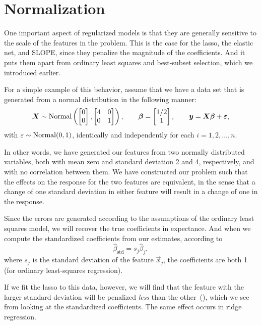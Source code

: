 \section{Normalization}\label{sec:normalization}

One important aspect of regularized models is that they are generally sensitive to the scale of the features in the problem. This is the case for the lasso, the elastic net, and SLOPE, since they penalize the magnitude of the coefficients. And it puts them apart from ordinary least squares and best-subset selection, which we introduced earlier.

For a simple example of this behavior, assume that we have a data set that is generated from a normal distribution in the following manner:
\[
  \boldsymbol{X} \sim \operatorname{Normal}\left(\begin{bmatrix}0 \\ 0\end{bmatrix}, \begin{bmatrix} 4 & 0 \\ 0 & 1\end{bmatrix}\right), \qquad \boldsymbol{\beta} = \begin{bmatrix} 1/2 \\ 1 \end{bmatrix}, \qquad \boldsymbol{y} = \boldsymbol{X}\boldsymbol{\beta} + \boldsymbol{\varepsilon},
\]
with \(\varepsilon \sim \operatorname{Normal}(0,1)\), identically and independently for each \(i = 1,2,\dots,n\).

In other words, we have generated our features from two normally distributed variables, both with mean zero and standard deviation 2 and 4, respectively, and with no correlation between them. We have constructed our problem such that the effects on the response for the two features are equivalent, in the sense that a change of one standard deviation in either feature will result in a change of one in the response.

Since the errors are generated according to the assumptions of the ordinary least squares model, we will recover the true coefficients in expectance. And when we compute the standardized coefficients from our estimates, according to
\[
  \hat{\beta}_\text{std} = s_j\hat{\beta}_j,
\]
where \(s_j\) is the standard deviation of the feature \(\vec{x}_j\), the coefficients are both 1 (for ordinary least-squares regression).

If we fit the lasso to this data, however, we will find that the feature with the larger standard deviation will be penalized \emph{less} than the other~(), which we see from looking at the standardized coefficients. The same effect occurs in ridge regression.


